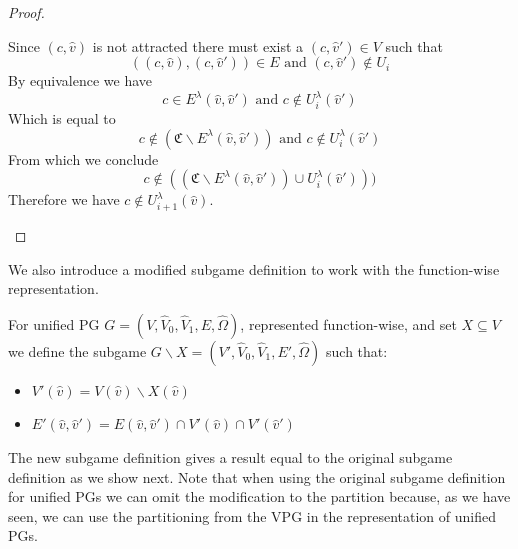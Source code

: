 \begin{lemma}
\begin{proof}
\begin{itemize}
			Since $(c,\hat{v})$ is not attracted there must exist a $(c,\hat{v}') \in V$ such that 
			\[ ((c,\hat{v}),(c,\hat{v}')) \in E  \text{ and } (c,\hat{v}') \notin U_i \]
			By equivalence we have 
			\[ c \in E^\lambda(\hat{v},\hat{v}')  \text{ and } c \notin U^\lambda_i(\hat{v}') \]
			Which is equal to
			\[ c \notin (\mathfrak{C} \backslash E^\lambda(\hat{v},\hat{v}'))  \text{ and } c \notin U^\lambda_i(\hat{v}') \]
			From which we conclude
			\[ c \notin ((\mathfrak{C} \backslash E^\lambda(\hat{v},\hat{v}')) \cup U^\lambda_i(\hat{v}'))) \]
			Therefore we have $c \notin U^\lambda_{i+1}(\hat{v})$.
		\end{itemize}
	\end{proof}
\end{lemma}

We also introduce a modified subgame definition to work with the function-wise representation.
\begin{definition}
	\label{def_Usubgame}
	For unified PG $G = (V,\hat{V}_0,\hat{V}_1,E,\hat{\Omega})$, represented function-wise, and set $X \subseteq V$ we define the subgame $G \backslash X = (V',\hat{V}_0,\hat{V}_1,E',\hat{\Omega})$ such that:
	\begin{itemize}
		\item $V'(\hat{v}) = V(\hat{v}) \backslash X(\hat{v})$
		\item $E'(\hat{v},\hat{v}') = E(\hat{v},\hat{v}') \cap V'(\hat{v}) \cap V'(\hat{v}')$
	\end{itemize}
\end{definition}
The new subgame definition gives a result equal to the original subgame definition as we show next. Note that when using the original subgame definition for unified PGs we can omit the modification to the partition because, as we have seen, we can use the partitioning from the VPG in the representation of unified PGs.
